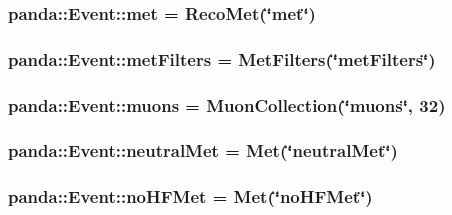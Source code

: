 \label{classpanda_1_1Event_acc4184933eb9ecfa7e7f9bcd2d8fff1a}
\hypertarget{classpanda_1_1Event_a11d22b206ec84054ea9eb095026ed551}{
\subsubsection[{met}]{ {\bf panda::Event::met} = {\bf RecoMet}(\char`\"{}met\char`\"{})}}
\label{classpanda_1_1Event_a11d22b206ec84054ea9eb095026ed551}
\hypertarget{classpanda_1_1Event_a45127567818ae586be29240c817cbe37}{
\subsubsection[{metFilters}]{ {\bf panda::Event::metFilters} = {\bf MetFilters}(\char`\"{}metFilters\char`\"{})}}
\label{classpanda_1_1Event_a45127567818ae586be29240c817cbe37}
\hypertarget{classpanda_1_1Event_a1b49b3f3ef0dacbd407e5d473a5c014f}{
\subsubsection[{muons}]{ {\bf panda::Event::muons} = {\bf MuonCollection}(\char`\"{}muons\char`\"{}, 32)}}
\label{classpanda_1_1Event_a1b49b3f3ef0dacbd407e5d473a5c014f}
\hypertarget{classpanda_1_1Event_a122944fe3d7433466f448a37274752fa}{
\subsubsection[{neutralMet}]{ {\bf panda::Event::neutralMet} = {\bf Met}(\char`\"{}neutralMet\char`\"{})}}
\label{classpanda_1_1Event_a122944fe3d7433466f448a37274752fa}
\hypertarget{classpanda_1_1Event_aef6c4ad7a43f8bba87e0ed0c9cf38fbe}{
\subsubsection[{noHFMet}]{ {\bf panda::Event::noHFMet} = {\bf Met}(\char`\"{}noHFMet\char`\"{})}}
